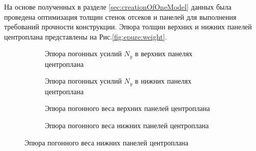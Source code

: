 На основе полученных в разделе \ref{sec:creationOfOneModel} данных была проведена оптимизация толщин стенок отсеков и панелей для выполнения требований прочности конструкции. Эпюра толщин верхних и нижних панелей центроплана представлены на Рис.\ref{fig:epure:weight}.

\begin{figure}[H]
\centering
\captionsetup{justification=centering}
\footnotesize
\begin{subfigure}[b]{0.49\textwidth}
	\centering
	\def\svgwidth{\textwidth}
	
	
	\label{fig:epure:loadn1top}
	\caption{Эпюра погонных усилий $N_y$ в верхних панелях центроплана}
\end{subfigure}
\begin{subfigure}[b]{0.49\textwidth}
	\centering
	\def\svgwidth{\textwidth}
	
	\label{fig:epure:loadn1bottom}
	\caption{Эпюра погонных усилий $N_y$ в нижних панелях центроплана}
\end{subfigure}
\begin{subfigure}[b]{0.49\textwidth}
	\centering
	\def\svgwidth{\textwidth}
	
	\label{fig:epure:loadweighttop}
	\caption{Эпюра погонного веса верхних панелей центроплана}
\end{subfigure}
\begin{subfigure}[b]{0.49\textwidth}
	\centering
	\def\svgwidth{\textwidth}		
	\label{fig:epure:loadweightbottom}
	\caption{Эпюра погонного веса нижних панелей центроплана}
\end{subfigure}
\label{fig:epures}
\end{figure}
%
%
%	
%
%	
%
%	



